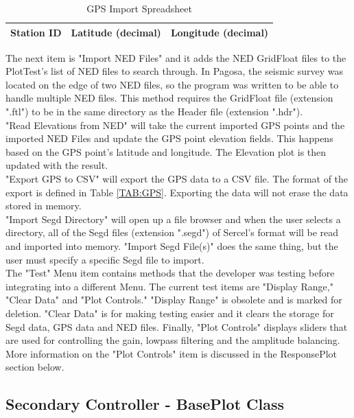 \documentclass[12pt]{article}
\begin{document}
\begin{table}[H]
\caption{GPS Import Spreadsheet}
\centering
\begin{tabular}{ c | c | c}
  \hline                  
  Station ID & Latitude (decimal) & Longitude (decimal) \\
  \hline
\end{tabular}
\label{TAB:GPS2}
\end{table}

The next item is "Import NED Files" and it adds the NED GridFloat files to the PlotTest's list of NED files to search through. In Pagosa, the seismic survey was located on the edge of two NED files, so the program was written to be able to handle multiple NED files. This method requires the GridFloat file (extension ".ftl") to be in the same directory as the Header file (extension ".hdr"). \\

"Read Elevations from NED" will take the current imported GPS points and the imported NED Files and update the GPS point elevation fields. This happens based on the GPS point's latitude and longitude. The Elevation plot is then updated with the result. \\

"Export GPS to CSV" will export the GPS data to a CSV file. The format of the export is defined in Table \ref{TAB:GPS}. Exporting the data will not erase the data stored in memory. \\

"Import Segd Directory" will open up a file browser and when the user selects a directory, all of the Segd files (extension ".segd") of Sercel's format will be read and imported into memory. "Import Segd File(s)" does the same thing, but the user must specify a specific Segd file to import. \\

The "Test" Menu item contains methods that the developer was testing before integrating into a different Menu. The current test items are "Display Range," "Clear Data" and "Plot Controls." "Display Range" is obsolete and is marked for deletion. "Clear Data" is for making testing easier and it clears the storage for Segd data, GPS data and NED files. Finally, "Plot Controls" displays sliders that are used for controlling the gain, lowpass filtering and the amplitude balancing. More information on the "Plot Controls" item is discussed in the ResponsePlot section below.

\subsection{Secondary Controller - BasePlot Class}
\end{document}
